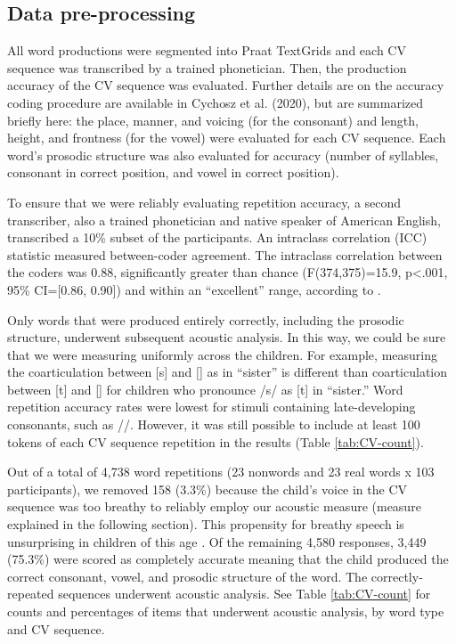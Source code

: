 \documentclass[a4paper,man,natbib,donotrepeattitle, apacite]{apa6}
\begin{document}
\subsection{Data pre-processing}

All word productions were segmented into Praat TextGrids \cite{boersmaPraatDoingPhonetics2018} and each CV sequence was transcribed by a trained phonetician. Then, the production accuracy of the CV sequence was evaluated. Further details are on the accuracy coding procedure are available in Cychosz et al. (2020), but are summarized briefly here: the place, manner, and voicing (for the consonant) and length, height, and frontness (for the vowel) were evaluated for each CV sequence. Each word’s prosodic structure was also evaluated for accuracy (number of syllables, consonant in correct position, and vowel in correct position). 

To ensure that we were reliably evaluating repetition accuracy, a second transcriber, also a trained phonetician and native speaker of American English, transcribed a 10\% subset of the participants. An intraclass correlation (ICC) statistic measured between-coder agreement. The intraclass correlation between the coders was 0.88, significantly greater than chance (F(374,375)=15.9, p<.001, 95\% CI=[0.86, 0.90]) and within an ``excellent'' range, according to \cite{cicchettiGuidelinesCriteriaRules1994}. 

Only words that were produced entirely correctly, including the prosodic structure, underwent subsequent acoustic analysis. In this way, we could be sure that we were measuring uniformly across the children. For example, measuring the coarticulation between [s] and [\textsci] as in ``sister'' is different than coarticulation between [t] and [\textsci] for children who pronounce /s/ as [t] in ``sister.'' Word repetition accuracy rates were lowest for stimuli containing late-developing consonants, such as /\textturnr/. However, it was still possible to include at least 100 tokens of each CV sequence repetition in the results (Table \ref{tab:CV-count}).

Out of a total of 4,738 word repetitions (23 nonwords and 23 real words x 103 participants), we removed 158 (3.3\%) because the child’s voice in the CV sequence was too breathy to reliably employ our acoustic measure (measure explained in the following section). This propensity for breathy speech is unsurprising in children of this age \cite{leeAcousticsChildrenSpeech1999}. Of the remaining 4,580 responses, 3,449 (75.3\%) were scored as completely accurate meaning that the child produced the correct consonant, vowel, and prosodic structure of the word. The correctly-repeated sequences underwent acoustic analysis. See Table \ref{tab:CV-count} for counts and percentages of items that underwent acoustic analysis, by word type and CV sequence.
\end{document}
